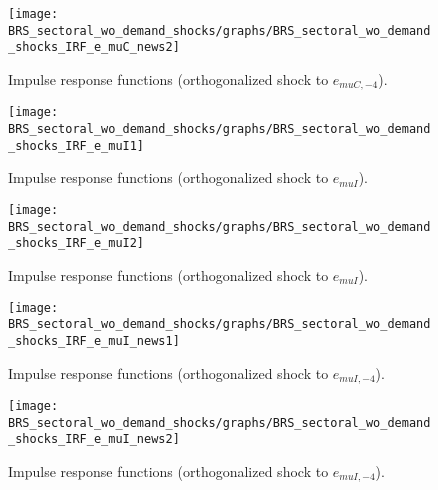 \begin{figure}[H]
\centering 
\texttt{[image: BRS\_sectoral\_wo\_demand\_shocks/graphs/BRS\_sectoral\_wo\_demand\_shocks\_IRF\_e\_muC\_news2]}
\caption{Impulse response functions (orthogonalized shock to ${e_{muC,-4}}$).}\label{Fig:IRF:e_muC_news:2}
\end{figure}
 
\begin{figure}[H]
\centering 
\texttt{[image: BRS\_sectoral\_wo\_demand\_shocks/graphs/BRS\_sectoral\_wo\_demand\_shocks\_IRF\_e\_muI1]}
\caption{Impulse response functions (orthogonalized shock to ${e_{muI}}$).}\label{Fig:IRF:e_muI:1}
\end{figure}
 
\begin{figure}[H]
\centering 
\texttt{[image: BRS\_sectoral\_wo\_demand\_shocks/graphs/BRS\_sectoral\_wo\_demand\_shocks\_IRF\_e\_muI2]}
\caption{Impulse response functions (orthogonalized shock to ${e_{muI}}$).}\label{Fig:IRF:e_muI:2}
\end{figure}
 
\begin{figure}[H]
\centering 
\texttt{[image: BRS\_sectoral\_wo\_demand\_shocks/graphs/BRS\_sectoral\_wo\_demand\_shocks\_IRF\_e\_muI\_news1]}
\caption{Impulse response functions (orthogonalized shock to ${e_{muI,-4}}$).}\label{Fig:IRF:e_muI_news:1}
\end{figure}
 
\begin{figure}[H]
\centering 
\texttt{[image: BRS\_sectoral\_wo\_demand\_shocks/graphs/BRS\_sectoral\_wo\_demand\_shocks\_IRF\_e\_muI\_news2]}
\caption{Impulse response functions (orthogonalized shock to ${e_{muI,-4}}$).}\label{Fig:IRF:e_muI_news:2}
\end{figure}
 
 

